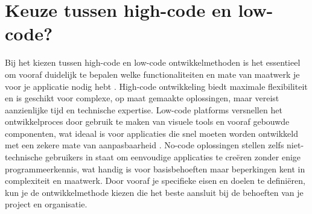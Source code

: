 \section{Keuze tussen high-code en low-code?}
Bij het kiezen tussen high-code en low-code ontwikkelmethoden is het essentieel om vooraf duidelijk te bepalen welke functionaliteiten en mate van maatwerk je voor je applicatie nodig hebt \autocite{Ballejos2024}. High-code ontwikkeling biedt maximale flexibiliteit en is geschikt voor complexe, op maat gemaakte oplossingen, maar vereist aanzienlijke tijd en technische expertise. Low-code platforms versnellen het ontwikkelproces door gebruik te maken van visuele tools en vooraf gebouwde componenten, wat ideaal is voor applicaties die snel moeten worden ontwikkeld met een zekere mate van aanpasbaarheid \autocite{Ballejos2024}. No-code oplossingen stellen zelfs niet-technische gebruikers in staat om eenvoudige applicaties te creëren zonder enige programmeerkennis, wat handig is voor basisbehoeften maar beperkingen kent in complexiteit en maatwerk. Door vooraf je specifieke eisen en doelen te definiëren, kun je de ontwikkelmethode kiezen die het beste aansluit bij de behoeften van je project en organisatie.

